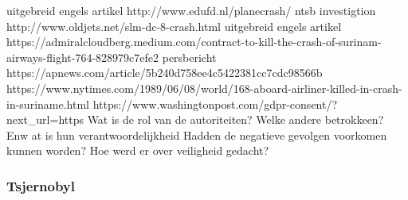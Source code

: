uitgebreid engels artikel
http://www.edufd.nl/planecrash/
ntsb investigtion
http://www.oldjets.net/slm-dc-8-crash.html
uitgebreid engels artikel
https://admiralcloudberg.medium.com/contract-to-kill-the-crash-of-surinam-airways-flight-764-828979c7efe2
persbericht
https://apnews.com/article/5b240d758ee4c5422381cc7cdc98566b
https://www.nytimes.com/1989/06/08/world/168-aboard-airliner-killed-in-crash-in-suriname.html
https://www.washingtonpost.com/gdpr-consent/?next_url=https%
Wat is de rol van de autoriteiten?
Welke andere betrokkeen? Enw at is hun verantwoordelijkheid
Hadden de negatieve gevolgen voorkomen kunnen worden?
Hoe werd er over veiligheid gedacht?


\subsubsection{Tsjernobyl}


